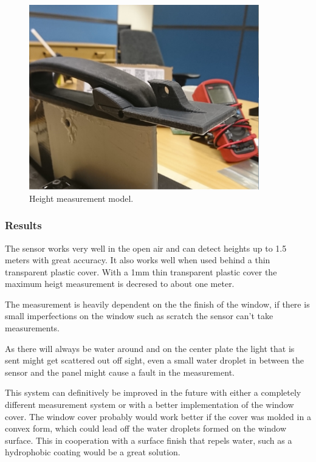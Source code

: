\begin{figure}[H]
	\centering
	\includegraphics[width = 10cm]{Figures/height_measure.jpg}
	\caption{Height measurement model.}
	\label{height_measure}
\end{figure}


\subsubsection{Results}

The sensor works very well in the open air and can detect heights up to 1.5 meters with great accuracy. It also works well when used behind a thin transparent plastic cover. With a 1mm thin transparent plastic cover the maximum heigt measurement is decresed to about one meter. 

The measurement is heavily dependent on the the finish of the window, if there is small imperfections on the window such as scratch the sensor can't take measurements.

As there will always be water around and on the center plate the light that is sent might get scattered out off sight, even a small water droplet in between the sensor and the panel might cause a fault in the measurement.  

This system can definitively be improved in the future with either a completely different measurement system or with a better implementation of the window cover. The window cover probably would work better if the cover was molded in a convex form, which could lead off the water droplets formed on the window surface. This in cooperation with a surface finish that repels water, such as a hydrophobic coating would be a great solution. 
